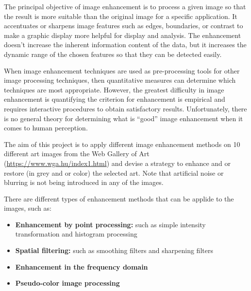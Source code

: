 \documentclass[conference]{IEEEtran}
\begin{document}
The principal objective of image enhancement is to process a given image so that the result is more suitable than the original image for a specific application. It accentuates or sharpens image features such as edges, boundaries, or contrast to make a graphic display more helpful for display and analysis. The enhancement doesn't increase the inherent information content of the data, but it increases the dynamic range of the chosen features so that they can be detected easily\cite{gonzalez}.

When image enhancement techniques are used as pre-processing tools for other image processing techniques, then quantitative measures can determine which techniques are most appropriate. However, the greatest difficulty in image enhancement is quantifying the criterion for enhancement is empirical and requires interactive procedures to obtain satisfactory results.
Unfortunately, there is no general theory for determining what is ``good'' image enhancement when it comes to human perception.

The aim of this project is to apply different image enhancement methods on 10 different art images from the Web
Gallery of Art (\url{https://www.wga.hu/index1.html}) and devise a strategy to enhance and or restore (in grey
and or color) the selected art. Note that artificial noise or blurring is not being introduced in any of the images.  





There are different types of enhancement methods that can be applide to the images, such as:
\begin{itemize}
\item \textbf{Enhancement by point processing:} such as simple intensity transformation and histogram processing
\item \textbf{Spatial filtering:} such as smoothing filters and sharpening filters
\item \textbf{Enhancement in the frequency domain}
\item \textbf{Pseudo-color image processing}
\end{itemize}


%
\end{document}
